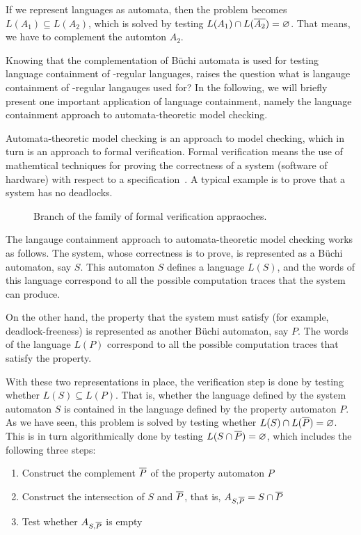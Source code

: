 If we represent languages as automata, then the problem becomes $L(A_1) \subseteq L(A_2)$, which is solved by testing $L(A_1) \cap L(\cl1{A_2}) = \varnothing$. That means, we have to complement the automton $A_2$.

Knowing that the complementation of Büchi automata is used for testing language containment of \om-regular languages, raises the question what is langauge containment of \om-regular langauges used for? In the following, we will briefly present one important application of language containment, namely the language containment approach to automata-theoretic model checking.

Automata-theoretic model checking is an approach to model checking, which in turn is an approach to formal verification. Formal verification means the use of mathemtical techniques for proving the correctness of a system (software of hardware) with respect to a specification~\cite{2007_vardi_model_checking}. A typical example is to prove that a system has no deadlocks.

\begin{figure}[htb]
\centering
\ModelChecking
\caption{Branch of the family of formal verification appraoches.}
\label{model_checking}
\end{figure}

The langauge containment approach to automata-theoretic model checking works as follows. The system, whose correctness is to prove, is represented as a Büchi automaton, say $S$. This automaton $S$ defines a language $L(S)$, and the words of this language correspond to all the possible computation traces that the system can produce.

On the other hand, the property that the system must satisfy (for example, deadlock-freeness) is represented as another Büchi automaton, say $P$. The words of the language $L(P)$ correspond to all the possible computation traces that satisfy the property.

With these two representations in place, the verification step is done by testing whether $L(S) \subseteq L(P)$. That is, whether the language defined by the system automaton $S$ is contained in the language defined by the property automaton $P$. As we have seen, this problem is solved by testing whether $L(S) \cap L(\cl1{P}) = \varnothing$. This is in turn algorithmically done by testing $L(S \cap \cl1{P}) = \varnothing$, which includes the following three steps:

\begin{enumerate}
\item Construct the complement $\cl1{P}$ of the property automaton $P$
\item Construct the intersection of $S$ and $\cl1{P}$, that is, $A_{S,\cl1{P}} = S \cap \cl1{P}$
\item Test whether $A_{S,\cl1{P}}$ is empty
\end{enumerate}

